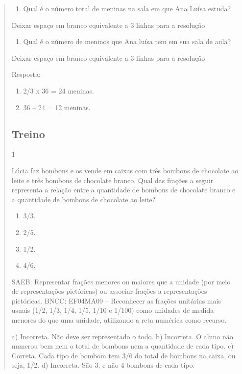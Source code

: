 \begin{mdframed}[linewidth=2pt,linecolor=salmao,roundcorner=2pt]
\begin{itemize}
{\begin{itemize}
\begin{escolha}
{\begin{quote}
{\begin{escolha}
{{{{\begin{enumerate}
\item
  Qual é o número total de meninas na sala em que Ana Luísa estuda?
\end{enumerate}

Deixar espaço em branco equivalente a 3 linhas para a resolução

\begin{enumerate}
\item
  Qual é o número de meninos que Ana luísa tem em sua sala de
  aula?
\end{enumerate}

Deixar espaço em branco equivalente a 3 linhas para a resolução

Resposta:

\begin{enumerate}
\item
  2/3 x 36 = 24 meninas.
\item
  36 -- 24 = 12 meninas.
\end{enumerate}

\subsection{Treino}

\num{1}

Lúcia faz bombons e os vende em caixas com três bombons de chocolate ao leite e três bombons de chocolate branco. Qual das frações a seguir representa a relação entre a quantidade de
bombons de chocolate branco e a quantidade de bombons de chocolate ao leite?

\begin{enumerate}
\item
  3/3.
\item
  2/5.
\item
  1/2.
\item
  4/6.
\end{enumerate}

SAEB: Representar frações menores ou maiores que a unidade (por meio de representações
pictóricas) ou associar frações a representações pictóricas.
BNCC: EF04MA09 -- Reconhecer as frações unitárias mais usuais (1/2, 1/3, 1/4, 1/5, 1/10 e 1/100) como
unidades de medida menores do que uma unidade, utilizando a reta numérica como recurso.

a) Incorreta. Não deve ser representado o todo.
b) Incorreta. O aluno não numerou bem nem o total de bombons nem a quantidade de cada tipo.
c) Correta. Cada tipo de bombom tem 3/6 do total de bombons na caixa, ou seja, 1/2.
d) Incorreta. São 3, e não 4 bombons de cada tipo.


}}}}
\end{escolha}}
\end{quote}}
\end{escolha}
\end{itemize}}
\end{itemize}
\end{mdframed}
